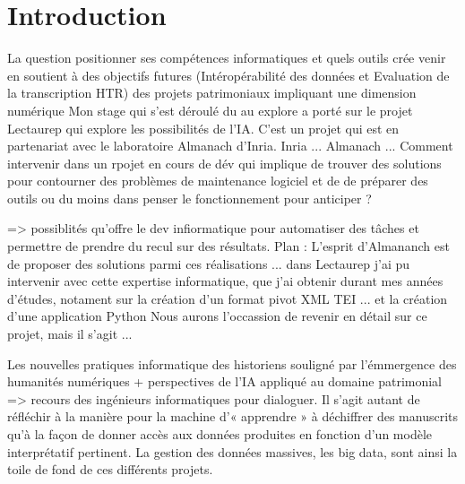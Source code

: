 \part*{Introduction}


\bigskip
La question positionner ses compétences informatiques et quels outils crée venir en soutient à des objectifs futures (Intéropérabilité des données et Evaluation de la transcription HTR) des projets patrimoniaux impliquant une dimension numérique  
Mon stage qui s'est déroulé du au explore a porté sur le projet Lectaurep qui explore les possibilités de l'IA. C'est un projet qui est en partenariat avec le laboratoire Almanach d'Inria. Inria ... Almanach ... 
Comment intervenir dans un rpojet en cours de dév qui implique de trouver des solutions pour contourner des problèmes de maintenance logiciel et de de préparer des outils ou du moins dans penser le fonctionnement pour anticiper  ? 

=> possiblités qu'offre le dev infiormatique pour automatiser des tâches et permettre de prendre du recul sur des résultats. 
Plan : L'esprit d'Almananch est de proposer des solutions parmi ces réalisations ... dans Lectaurep j'ai pu intervenir avec cette expertise informatique, que j'ai obtenir durant mes années d'études, notament sur la création d'un format pivot XML TEI ... et la création d'une application Python  Nous aurons l'occassion de revenir en détail sur ce projet, mais il s'agit ... 


Les nouvelles pratiques informatique  des historiens souligné par l'émmergence des humanités numériques + perspectives de l'IA appliqué au domaine patrimonial => recours des ingénieurs informatiques pour dialoguer. 
Il s’agit autant de réfléchir à la manière pour la machine d’« apprendre » à déchiffrer des manuscrits qu’à la façon de donner accès aux données produites en fonction d’un modèle interprétatif pertinent. La gestion des données massives, les big data, sont ainsi la toile de fond de ces différents projets.


